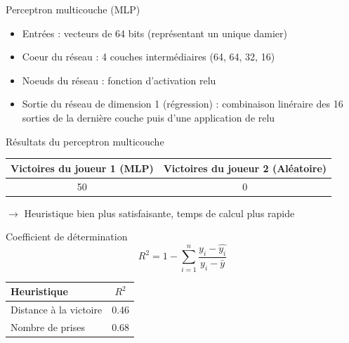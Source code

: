 \documentclass{beamer}
\begin{document}
\begin{frame}{Perceptron multicouche (MLP)}
    \begin{itemize}
        \item Entrées : vecteurs de 64 bits (représentant un unique damier)
        \item Coeur du réseau : 4 couches intermédiaires (64, 64, 32, 16)
        \item Noeuds du réseau : fonction d'activation \alert{relu}
        \item Sortie du réseau de dimension 1 (régression) : combinaison linéraire des 16 sorties de la dernière couche puis d'une application de \alert{relu}
    \end{itemize}
\end{frame}

\begin{frame}{Résultats du perceptron multicouche}
    \begin{center}
        \begin{tabular}{ | c | c | }
            \hline
            Victoires du joueur 1 (MLP) & Victoires du joueur 2 (Aléatoire) \\ \hline
            50                          & 0                                 \\ \hline
        \end{tabular}
    \end{center}
    $\rightarrow$ Heuristique bien plus satisfaisante, temps de calcul plus rapide
\end{frame}

\begin{frame}{Coefficient de détermination}
    $$R^2 = 1 - \sum_{i=1}^{n} \frac{y_i - \hat{y_i}}{y_i - \bar{y}}$$
    \begin{center}
        \begin{tabular}{ | l | c | }
            \hline
            Heuristique & $R^2$ \\ \hline
            Distance à la victoire & 0.46 \\ \hline
            Nombre de prises & 0.68 \\ \hline
        \end{tabular}
    \end{center}
\end{frame}
\end{document}
